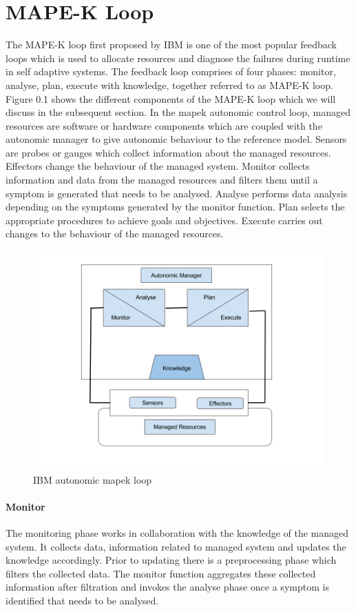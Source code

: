 \section{MAPE-K Loop }
The MAPE-K loop first proposed by IBM is one of the most popular feedback loops which is used to allocate resources and diagnose the failures during runtime in self adaptive systems. The feedback loop comprises of four phases: monitor, analyse, plan, execute with knowledge, together referred to as MAPE-K loop. Figure 0.1 shows the different components of the MAPE-K loop which we will discuss in the subsequent section. In the mapek autonomic control loop, managed resources are software or hardware components which are coupled with the autonomic manager to give autonomic behaviour to the reference model. Sensors are probes or gauges which collect information about the managed resources. Effectors change the behaviour of the managed system. Monitor collects information and data from the managed resources and filters them until a symptom is generated that needs to be analysed. Analyse performs data analysis depending on the symptoms generated by the monitor function. Plan selects the appropriate procedures to achieve goals and objectives. Execute carries out changes to the behaviour of the managed resources.


\begin{figure}[H]
\includegraphics[width=5in]{img/ibmmapekloop}
\caption{IBM autonomic mapek loop}
\end{figure}
\paragraph*{Monitor}
The monitoring phase works in collaboration with the knowledge of the managed system. It collects data, information related to managed system and updates the knowledge accordingly. Prior to updating there is a preprocessing phase which filters the collected data. The monitor function aggregates these collected information after filtration and invokes the analyse phase once a symptom is identified that needs to be analysed.

